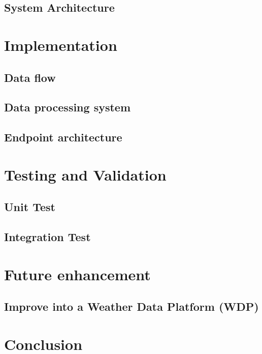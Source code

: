 \documentclass[12pt, a4paper]{report}
\begin{document}
\section{System Architecture}


\newpage
\chapter{Implementation}
\section{Data flow}

\section{Data processing system}

\section{Endpoint architecture}



\chapter{Testing and Validation}
\section{Unit Test}

\section{Integration Test}


\newpage
\chapter{Future enhancement}
\section*{Improve into a Weather Data Platform (WDP)}


\newpage
\chapter{Conclusion}




\end{document}
